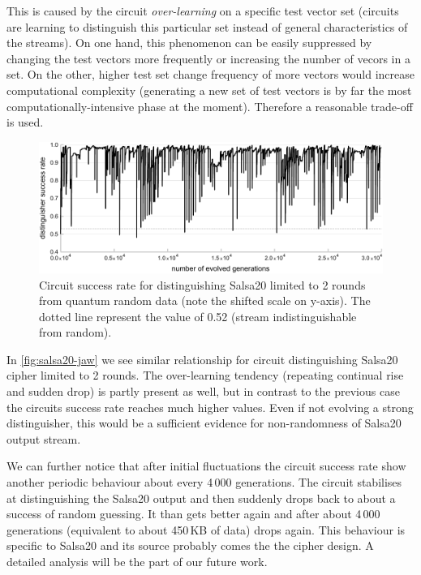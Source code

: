 \documentclass[12pt,oneside]{fithesis2}		%
\renewcommand{\_}{\leavevmode \kern0.0em\vbox{\hrule width0.4em}}
\begin{document}
This is caused by the circuit \textit{over-learning} on a specific test vector set
(circuits are learning to distinguish this particular set instead of general characteristics of the streams).
On one hand, this phenomenon can be easily suppressed by changing the test vectors more frequently or increasing the number of vecors
in a set. On the other, higher test set change frequency of more vectors 
would increase computational complexity (generating a new set of test vectors is by far
the most computationally-intensive phase at the moment). Therefore a reasonable trade-off is used.

\begin{figure}[t!]
\centering
\includegraphics[width=\textwidth]{images/jaw-salsa}
\caption{Circuit success rate for distinguishing Salsa20 limited to 2 rounds from quantum random data (note the shifted 
scale on y-axis). The dotted line represent the value of 0.52 (stream indistinguishable from random).}
\label{fig:salsa20-jaw}
\end{figure}

In \autoref{fig:salsa20-jaw} we see similar relationship for circuit distinguishing Salsa20 cipher limited to 2 rounds.
The over-learning tendency (repeating continual rise and sudden drop) is partly present as well, but in contrast to the previous case
the circuits success rate reaches much higher values. Even if not evolving a strong distinguisher, this would be a sufficient
evidence for non-randomness of Salsa20 output stream.

We can further notice that after initial fluctuations the circuit success rate show another periodic behaviour about every 4\,000
generations. The circuit stabilises at distinguishing the Salsa20 output and then suddenly drops back to about a success of random
guessing. It than gets better again and after about 4\,000 generations (equivalent to about 450\,KB of data) drops again.
This behaviour is specific to Salsa20 and its source probably comes the the cipher design. A detailed analysis will be
the part of our future work.
\end{document}
